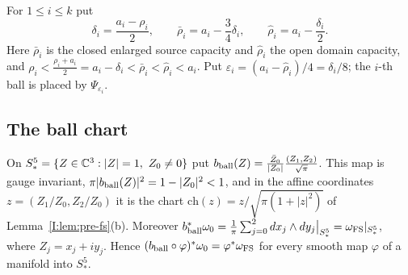 \begin{definition}\label{I:def:str-enlarged}
For $1\le i\le k$ put
\[
 \delta_i=\frac{a_i-\rho_i}2,\qquad
 \bar\rho_i=a_i-\frac34\delta_i,\qquad \hat\rho_i=a_i-\frac{\delta_i}2 .
\]
Here $\bar\rho_i$ is the closed enlarged source capacity and $\hat\rho_i$ the open domain capacity, and
$\rho_i<\frac{\rho_i+a_i}2=a_i-\delta_i<\bar\rho_i<\hat\rho_i<a_i$. Put
$\varepsilon_i=(a_i-\hat\rho_i)/4=\delta_i/8$; the $i$-th ball is placed by $\Psi_{\varepsilon_i}$.
\end{definition}

\subsection{The ball chart}

\begin{lemma}\label{I:lem:rtc-ball-chart}
On $S^5_*=\{Z\in\mathbb{C}^3:|Z|=1,\ Z_0\ne0\}$ put $b_{\rm ball}(Z)=\frac{\bar Z_0}{|Z_0|}\frac{(Z_1,Z_2)}{\sqrt\pi}$. This map is gauge
invariant, $\pi|b_{\rm ball}(Z)|^2=1-|Z_0|^2<1$, and in the affine coordinates $z=(Z_1/Z_0,Z_2/Z_0)$ it is the chart
$\mathrm{ch}(z)=z/\sqrt{\pi(1+|z|^2)}$ of Lemma~\ref{I:lem:pre-fs}(b). Moreover
$b_{\rm ball}^*\omega_0=\frac1\pi\sum_{j=0}^2dx_j\wedge dy_j\big|_{S^5_*}=\omega_{\rm FS}|_{S^5_*}$, where $Z_j=x_j+iy_j$. Hence
$(b_{\rm ball}\circ\varphi)^*\omega_0=\varphi^*\omega_{\rm FS}$ for every smooth map $\varphi$ of a manifold into $S^5_*$.
\end{lemma}

